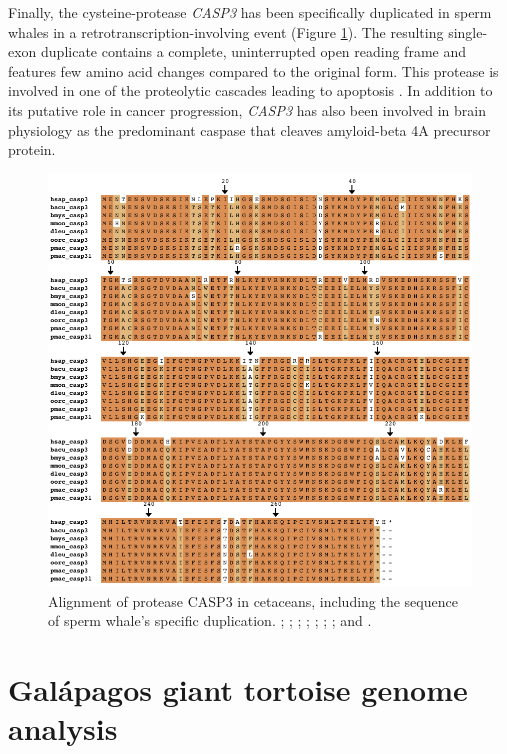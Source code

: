 Finally, the cysteine-protease \textit{CASP3} has been specifically duplicated in sperm whales in a retrotranscription-involving event (Figure \ref{f_results_sperm_whale_alignments_casp3}).
The resulting single-exon duplicate contains a complete, uninterrupted open reading frame and features few amino acid changes compared to the original form.
This protease is involved in one of the proteolytic cascades leading to apoptosis \cite{McIlwain2015}.
In addition to its putative role in cancer progression, \textit{CASP3} has also been involved in brain physiology as the predominant caspase that cleaves amyloid-beta 4A precursor protein.

\begin{figure}[b!]
    \begin{center}
        \includegraphics[width=\textwidth]{figures/alignment_casp3.pdf}
        \caption[Alignment of protease CASP3 in cetaceans]{Alignment of protease CASP3 in cetaceans, including the sequence of sperm whale's specific duplication. \hsap; \bacu; \bmys; \mmon; \dleu; \ttru; \oorc; and \pmac.}
        \label{f_results_sperm_whale_alignments_casp3}
    \end{center}
\end{figure}

\section{Gal\'{a}pagos giant tortoise genome analysis} \label{s_george_genome_results}

